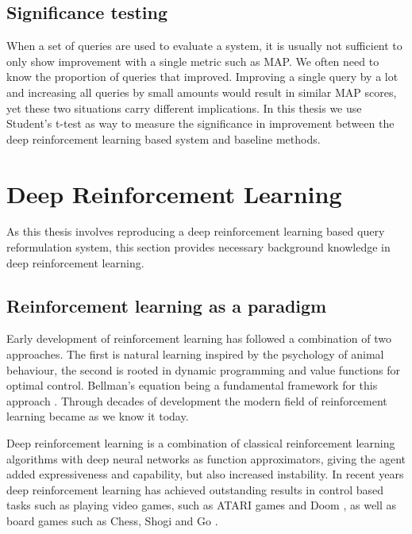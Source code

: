 \subsection{Significance testing}

When a set of queries are used to evaluate a system, it is usually not sufficient to only show improvement with a single metric such as MAP. We often need to know the proportion of queries that improved. Improving a single query by a lot and increasing all queries by small amounts would result in similar MAP scores, yet these two situations carry different implications. In this thesis we use Student's t-test as way to measure the significance in improvement between the deep reinforcement learning based system and baseline methods.


\section{Deep Reinforcement Learning}

As this thesis involves reproducing a deep reinforcement learning based query reformulation system, this section provides necessary background knowledge in deep reinforcement learning.

\subsection{Reinforcement learning as a paradigm}
Early development of reinforcement learning has followed a combination of two approaches. The first is natural learning inspired by the psychology of animal behaviour, the second is rooted in dynamic programming and value functions for optimal control. Bellman's equation being a fundamental framework for this approach \cite{bellman1966dynamic}. Through decades of development the modern field of reinforcement learning became as we know it today. 

Deep reinforcement learning is a combination of classical reinforcement learning algorithms with deep neural networks as function approximators, giving the agent added expressiveness and capability, but also increased instability. In recent years deep reinforcement learning has achieved outstanding results in control based tasks such as playing video games, such as ATARI games\cite{mnih2013playing} and Doom\cite{lample2017playing} , as well as board games such as Chess, Shogi and Go \cite{silver2017mastering} \cite{silver2016mastering}.


